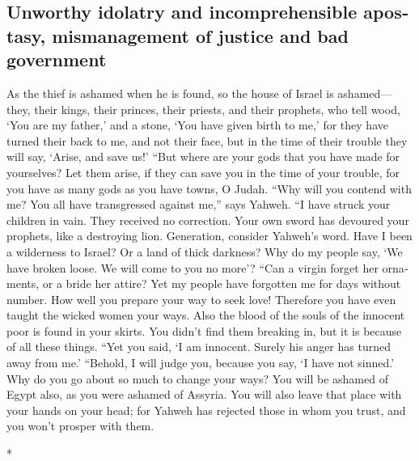 \begin{paracol}{2}
\begin{otherlanguage}{english}
\hypertarget{unworthy-idolatry-and-incomprehensible-apostasy-mismanagement-of-justice-and-bad-government}{%
\subsection{Unworthy idolatry and incomprehensible apostasy,
mismanagement of justice and bad
government}\label{unworthy-idolatry-and-incomprehensible-apostasy-mismanagement-of-justice-and-bad-government}}

 As the thief is ashamed when he is found, so the house
of Israel is ashamed--- they, their kings, their princes, their priests,
and their prophets,  who tell wood, `You are my father,'
and a stone, `You have given birth to me,' for they have turned their
back to me, and not their face, but in the time of their trouble they
will say, `Arise, and save us!'  ``But where are your
gods that you have made for yourselves? Let them arise, if they can save
you in the time of your trouble, for you have as many gods as you have
towns, O Judah.  ``Why will you contend with me? You all
have transgressed against me,'' says Yahweh.  ``I have
struck your children in vain. They received no correction. Your own
sword has devoured your prophets, like a destroying lion.
 Generation, consider Yahweh's word. Have I been a
wilderness to Israel? Or a land of thick darkness? Why do my people say,
`We have broken loose. We will come to you no more'? 
``Can a virgin forget her ornaments, or a bride her attire? Yet my
people have forgotten me for days without number.  How
well you prepare your way to seek love! Therefore you have even taught
the wicked women your ways.  Also the blood of the souls
of the innocent poor is found in your skirts. You didn't find them
breaking in, but it is because of all these things. 
``Yet you said, `I am innocent. Surely his anger has turned away from
me.' ``Behold, I will judge you, because you say, `I have not sinned.'
 Why do you go about so much to change your ways? You
will be ashamed of Egypt also, as you were ashamed of Assyria.
 You will also leave that place with your hands on your
head; for Yahweh has rejected those in whom you trust, and you won't
prosper with them.

\end{otherlanguage}

\switchcolumn[0]*


\end{paracol}
